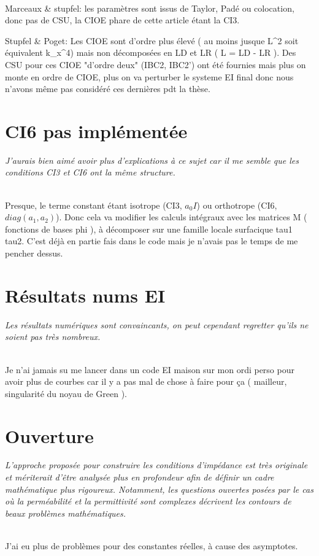 \documentclass{article}
\newenvironment{REM}{\itshape}{}
\newenvironment{REP}{~{}\\}{}
\begin{document}
\begin{REP}
    Marceaux \& stupfel: les paramètres sont issus de Taylor, Padé ou colocation, donc pas de CSU, la CIOE phare de cette article étant la CI3.

    Stupfel \& Poget: Les CIOE sont d'ordre plus élevé ( au moins jusque L^2 soit équivalent k_x^4) mais non décomposées en LD et LR ( L = LD - LR ). 
    Des CSU pour ces CIOE "d'ordre deux" (IBC2, IBC2') ont été fournies mais plus on monte en ordre de CIOE, plus on va perturber le systeme EI final donc nous n’avons même pas considéré ces dernières pdt la thèse.
\end{REP}

\section{CI6 pas implémentée}
\begin{REM}
    J’aurais bien aimé avoir plus d’explications à ce sujet car il me semble que les conditions CI3 et CI6 ont la même structure.
\end{REM}

\begin{REP}
    Presque, le terme constant étant isotrope (CI3, \(a_0 I\)) ou orthotrope (CI6, \(diag(a_1,a_2)\)).
    Donc cela va modifier les calculs intégraux avec les matrices M ( fonctions de bases phi ), à décomposer sur une famille locale surfacique tau1 tau2.
    C'est déjà en partie fais dans le code mais je n'avais pas le temps de me pencher dessus.
\end{REP}

\section{Résultats nums EI}
\begin{REM}
    Les résultats numériques sont convaincants, on peut cependant regretter qu’ils ne soient pas très nombreux.
\end{REM}

\begin{REP}
    Je n'ai jamais su me lancer dans un code EI maison sur mon ordi perso pour avoir plus de courbes car il y a pas mal de chose à faire pour ça ( mailleur, singularité du noyau de Green ).
\end{REP}

\section{Ouverture}
\begin{REM}
    L’approche proposée pour construire les conditions d’impédance est très originale et mériterait d’être analysée plus en profondeur afin de définir un cadre mathématique plus rigoureux.
    Notamment, les questions ouvertes posées par le cas où la perméabilité et la permittivité sont complexes décrivent les contours de beaux problèmes mathématiques.
\end{REM}

\begin{REP}
    J'ai eu plus de problèmes pour des constantes réelles, à cause des asymptotes.
\end{REP}
\end{document}
